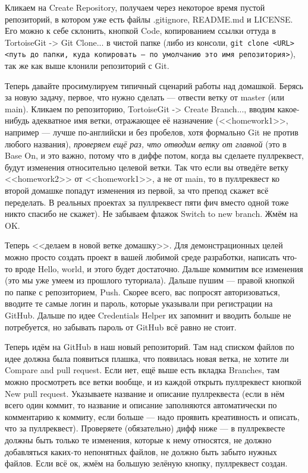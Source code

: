 \documentclass{../../text-style}
\begin{document}
Кликаем на Create Repository, получаем через некоторое время пустой репозиторий, в котором уже есть файлы .gitignore, README.md и LICENSE. Его можно к себе склонить, кнопкой Code, копированием ссылки оттуда в TortoiseGit -> Git Clone... в чистой папке (либо из консоли, \verb|git clone <URL> <путь до папки, куда копировать — по умолчанию это имя репозитория>|), так же как выше клонили репозиторий с Git.

Теперь давайте просимулируем типичный сценарий работы над домашкой. Берясь за новую задачу, первое, что нужно сделать --- отвести ветку от master (или main). Кликаем по репозиторию, TortoiseGit -> Create Branch..., вводим какое-нибудь адекватное имя ветки, отражающее её назначение (<<homework1>>, например --- лучше по-английски и без пробелов, хотя формально Git не против любого названия), \emph{проверяем ещё раз, что отводим ветку от главной} (это в Base On, и это важно, потому что в диффе потом, когда вы сделаете пуллреквест, будут изменения относительно целевой ветки. Так что если вы отведёте ветку <<homework2>> от <<homework1>>, а не от main, то в пуллреквест ко второй домашке попадут изменения из первой, за что препод скажет всё переделать. В реальных проектах за пуллреквест пяти фич вместо одной тоже никто спасибо не скажет). Не забываем флажок Switch to new branch. Жмём на OK.

Теперь <<делаем в новой ветке домашку>>. Для демонстрационных целей можно просто создать проект в вашей любимой среде разработки, написать что-то вроде Hello, world, и этого будет достаточно. Дальше коммитим все изменения (это мы уже умеем из прошлого туториала). Дальше пушим --- правой кнопкой по папке с репозиторием, Push. Скорее всего, вас попросят авторизоваться, вводите те самые логин и пароль, которые указывали при регистрации на GitHub. Дальше по идее Credentials Helper их запомнит и вводить больше не потребуется, но забывать пароль от GitHub всё равно не стоит.

Теперь идём на GitHub в наш новый репозиторий. Там над списком файлов по идее должна была появиться плашка, что появилась новая ветка, не хотите ли Compare and pull request. Если нет, ещё выше есть вкладка Branches, там можно просмотреть все ветки вообще, и из каждой открыть пуллреквест кнопкой New pull request. Указываете название и описание пуллреквеста (если в нём всего один коммит, то название и описание заполняются автоматически по комментарию к коммиту, если больше --- надо проявить креативность и описать, что за пуллреквест). Проверяете (обязательно) дифф ниже --- в пуллреквесте должны быть только те изменения, которые к нему относятся, не должно добавляться каких-то непонятных файлов, не должно быть забыто нужных файлов. Если всё ок, жмём на большую зелёную кнопку, пуллреквест создан.
\end{document}
